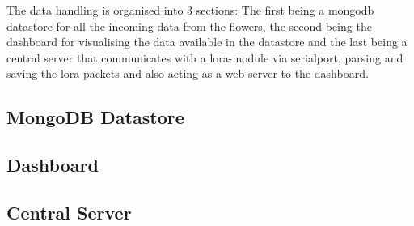 The data handling is organised into 3 sections: The first being a mongodb datastore for all the incoming data from the flowers, the second being the dashboard for visualising the data available in the datastore and the last being a central server that communicates with a lora-module via serialport, parsing and saving the lora packets and also acting as a web-server to the dashboard.

\subsection{MongoDB Datastore}

\subsection{Dashboard}

\subsection{Central Server}

